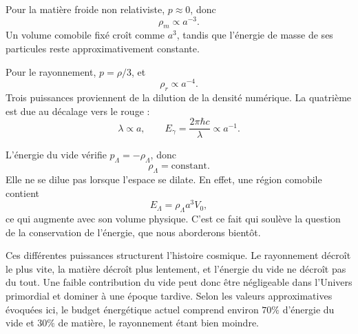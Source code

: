 Pour la matière froide non relativiste, \(p\approx0\), donc
\begin{equation}
\rho_m\propto a^{-3}.
\end{equation}
Un volume comobile fixé croît comme \(a^3\), tandis que l’énergie de masse de ses particules reste approximativement constante.

Pour le rayonnement, \(p=\rho/3\), et
\begin{equation}
\rho_r\propto a^{-4}.
\end{equation}
Trois puissances proviennent de la dilution de la densité numérique. La quatrième est due au décalage vers le rouge :
\begin{equation}
\lambda\propto a,
\qquad
E_\gamma=\frac{2\pi\hbar c}{\lambda}\propto a^{-1}.
\end{equation}

\begin{classroomqa}
\end{classroomqa}

L’énergie du vide vérifie \(p_\Lambda=-\rho_\Lambda\), donc
\begin{equation}
\rho_\Lambda=\text{constant}.
\end{equation}
Elle ne se dilue pas lorsque l’espace se dilate. En effet, une région comobile contient
\begin{equation}
E_\Lambda=\rho_\Lambda a^3V_0,
\end{equation}
ce qui augmente avec son volume physique. C’est ce fait qui soulève la question de la conservation de l’énergie, que nous aborderons bientôt.

Ces différentes puissances structurent l’histoire cosmique. Le rayonnement décroît le plus vite, la matière décroît plus lentement, et l’énergie du vide ne décroît pas du tout. Une faible contribution du vide peut donc être négligeable dans l’Univers primordial et dominer à une époque tardive. Selon les valeurs approximatives évoquées ici, le budget énergétique actuel comprend environ \(70\%\) d’énergie du vide et \(30\%\) de matière, le rayonnement étant bien moindre.


